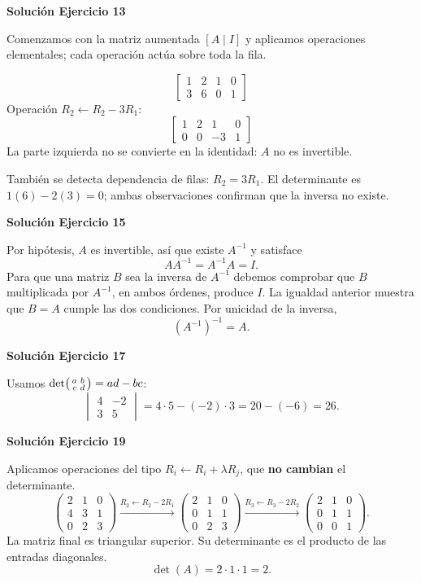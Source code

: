 \documentclass[12pt]{article}
\theoremstyle{remark}
\begin{document}
\par\bigskip\noindent\textbf{Solución Ejercicio 13}\par\nobreak
Comenzamos con la matriz aumentada $[A\mid I]$ y aplicamos operaciones elementales; cada operación actúa sobre toda la fila.

\[
\left[\begin{array}{rr|rr}1&2&1&0\\3&6&0&1\end{array}\right]
\]
Operación $R_{2}\leftarrow R_{2}-3R_{1}$:
\[
\left[\begin{array}{rr|rr}1&2&1&0\\0&0&-3&1\end{array}\right]
\]
La parte izquierda no se convierte en la identidad: $A$ no es invertible.

También se detecta dependencia de filas: $R_2=3R_1$. El determinante es $1(6)-2(3)=0$; ambas observaciones confirman que la inversa no existe.


\par\bigskip\noindent\textbf{Solución Ejercicio 15}\par\nobreak
Por hipótesis, $A$ es invertible, así que existe $A^{-1}$ y satisface
\[
AA^{-1}=A^{-1}A=I.
\]
Para que una matriz $B$ sea la inversa de $A^{-1}$ debemos comprobar que $B$ multiplicada por $A^{-1}$, en ambos órdenes, produce $I$. La igualdad anterior muestra que $B=A$ cumple las dos condiciones. Por unicidad de la inversa,
\[
\boxed{(A^{-1})^{-1}=A}.
\]

\par\bigskip\noindent\textbf{Solución Ejercicio 17}\par\nobreak
Usamos $\det\begin{psmallmatrix}a&b\\c&d\end{psmallmatrix}=ad-bc$:
\[
\begin{vmatrix}4&-2\\3&5\end{vmatrix}=4\cdot 5-(-2)\cdot 3=20-(-6)=26.
\]

\par\bigskip\noindent\textbf{Solución Ejercicio 19}\par\nobreak
Aplicamos operaciones del tipo $R_i\leftarrow R_i+\lambda R_j$, que \textbf{no cambian} el determinante.
\[
\begin{pmatrix}2&1&0\\4&3&1\\0&2&3\end{pmatrix}\xrightarrow{R_2\leftarrow R_2-2R_1}\begin{pmatrix}2&1&0\\0&1&1\\0&2&3\end{pmatrix}\xrightarrow{R_3\leftarrow R_3-2R_2}\begin{pmatrix}2&1&0\\0&1&1\\0&0&1\end{pmatrix}.
\]
La matriz final es triangular superior. Su determinante es el producto de las entradas diagonales. \[
\boxed{\det(A)=2\cdot1\cdot1=2}.
\]
\end{document}
